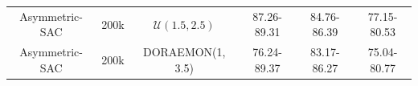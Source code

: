 \begin{table}
{\begin{tabular}{cccccc}
\rowcolor[HTML]{FFFFFF} 
{\color[HTML]{000000} Asymmetric-SAC}     & {\color[HTML]{000000} 200k}                     & {\color[HTML]{000000} \( \mathcal{U}(1.5, 2.5) \)} & {\color[HTML]{000000} 87.26-89.31}                                                                            & {\color[HTML]{000000} 84.76-86.39}                                                                         & {\color[HTML]{000000} 77.15-80.53}                                                                          \\
\rowcolor[HTML]{EFEFEF} 
{\color[HTML]{000000} Asymmetric-SAC}     & {\color[HTML]{000000} 200k}                     & {\color[HTML]{000000} DORAEMON(1, 3.5)}            & {\color[HTML]{000000} 76.24-89.37}                                                                            & {\color[HTML]{000000} 83.17-86.27}                                                                         & {\color[HTML]{000000} 75.04-80.77}                                                                         
\end{tabular}%
}
\end{table}

